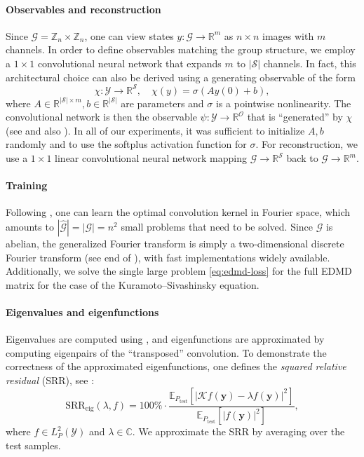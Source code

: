 \documentclass[preprint,12pt,authoryear]{elsarticle}
\newcommand{\Z}{\mathbb Z}
\newcommand{\R}{\mathbb{R}}
\newcommand{\C}{\mathbb{C}}
\newcommand{\Ptest}{P_{\mathrm{test}}}
\newcommand{\Fourier}[1]{\widehat{#1}}
\newcommand\Kc{\mathcal K}
\newcommand\Gc{\mathcal G}
\newcommand\Oc{\mathcal O}
\newcommand\Yc{\mathcal Y}
\newcommand\Sc{\mathcal S}
\newcommand\Koopman{\Kc}
\begin{document}
{\paragraph{Observables and reconstruction} Since $\Gc = \Z_n \times \Z_n$, one can view states $y : \Gc \rightarrow \R^m$ as $n \times n$ images with $m$ channels. In order to define observables matching the group structure, we employ a $1 \times 1$ convolutional neural network that expands $m$ to $|\Sc|$ channels. In fact, this architectural choice can also be derived using a generating observable of the form 
$$
    \chi : \Yc \rightarrow \R^\Sc, \quad \chi(y) = \sigma( A y(0)+b),
$$ 
where $A \in \R^{|\Sc|\times m}, b \in \R^{|\Sc|}$
are parameters and $\sigma$ is a pointwise nonlinearity. The convolutional network is then the observable $\psi : \Yc \rightarrow \R^\Oc$ that is ``generated'' by $\chi$ (see  and also ). 
In all of our experiments, it was sufficient to initialize $A,b$ randomly and to use the softplus activation function for $\sigma$. For reconstruction, we use a $1 \times 1$ linear convolutional neural network mapping $\Gc \rightarrow \R^\Sc$ back to $\Gc \rightarrow \R^m$.

\paragraph{Training}
Following , one can learn the optimal convolution kernel in Fourier space, which amounts to $|\Fourier{\Gc}| = |\Gc| = n^2$ small problems that need to be solved. 
Since $\Gc$ is abelian, the generalized Fourier transform is simply a two-dimensional discrete Fourier transform (see end of ), with fast implementations widely available. Additionally, we solve the single large problem \eqref{eq:edmd-loss} for the full EDMD matrix for the case of the Kuramoto--Sivashinsky equation.

\paragraph{Eigenvalues and eigenfunctions}
Eigenvalues are computed using , and eigenfunctions are approximated by computing eigenpairs of the ``transposed'' convolution. To demonstrate the correctness of the approximated eigenfunctions, one defines the \emph{squared relative residual} (SRR), see \cite{colbrook2023residual}:
\begin{equation}
    \mathrm{SRR}_{\mathrm{eig}}(\lambda, f) = 100\% \cdot \frac{\mathbb E_{\Ptest} [|\Koopman f(\bm y) - \lambda f(\bm y)|^2]}{\mathbb E_{\Ptest}[|f(\bm y)|^2]},
    \label{eq:error-eigenfunctions}
\end{equation}
where $f \in L^2_P(\Yc)$ and $\lambda \in \C$. %
We approximate the SRR by averaging over the test samples.


}
\end{document}

